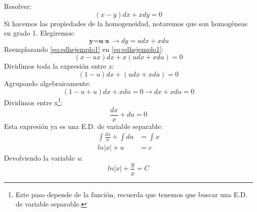 \documentclass[
	11pt, %
	fleqn, %
	a4paper, %
]{LegrandOrangeBook}
\begin{document}
\begin{exercise}\label{eq:edhejemplo1}
Resolver:
\begin{equation}
(x-y)dx+xdy=0
\end{equation}
Si hacemos las propiedades de la homogeneidad, notaremos que son homogéneas en grado 1. Elegiremos:
\begin{equation}\label{eq:edhejemplo2}
\textbf{y=u$\cdot$x} \longrightarrow dy=udx+xdu
\end{equation}
Reemplazando \ref{eq:edhejemplo1} en \ref{eq:edhejemplo1}:
\begin{displaymath}
(x-ux)dx+x(udx+xdu)=0
\end{displaymath}
Dividimos toda la expresión entre \textit{x}:
\begin{displaymath}
(1-u)dx+(udx+xdu)=0
\end{displaymath}
Agrupando algebraicamente:
\begin{displaymath}
(1-u+u)dx+xdu=0 \longrightarrow  dx+xdu=0
\end{displaymath}
Dividimos entre x\footnote{Este paso depende de la función, recuerda que tenemos que buscar una E.D. de variable separable.}:
\begin{displaymath}
\frac{dx}{x}+du=0
\end{displaymath}
Esta expresión ya es una E.D. de variable separable:
\begin{displaymath}
\begin{split}
\int\frac{dx}{x}+\int du&=\int x\\
ln|x|+u&=c
\end{split}
\end{displaymath}
Devolviendo la variable \textit{u}:
\begin{equation*}
\boxed{ln|x|+\frac{y}{x}=C}
\end{equation*}
\end{exercise}
\end{document}

